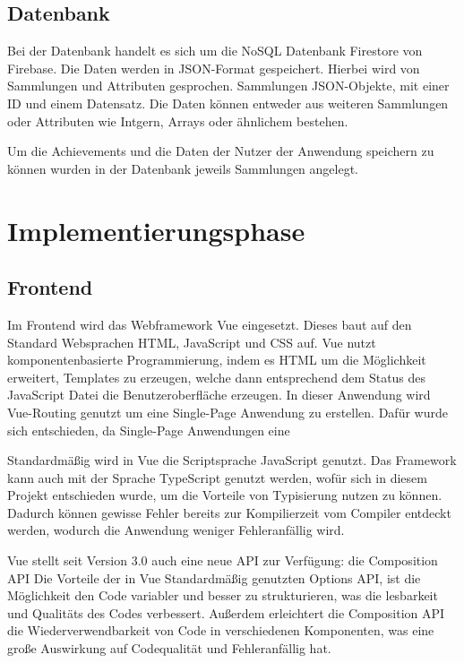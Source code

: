 \documentclass[12pt]{article}
\begin{document}
\subsection{Datenbank}

Bei der Datenbank handelt es sich um die NoSQL Datenbank Firestore
von Firebase. Die Daten werden in JSON-Format gespeichert. Hierbei wird
von Sammlungen und Attributen gesprochen. Sammlungen JSON-Objekte, mit einer
ID und einem Datensatz. Die Daten können entweder aus weiteren Sammlungen
oder Attributen wie Intgern, Arrays oder ähnlichem bestehen.

Um die Achievements und die Daten der Nutzer der Anwendung speichern zu können
wurden in der Datenbank jeweils Sammlungen angelegt.


%
%

\section{Implementierungsphase}

\subsection{Frontend}

Im Frontend wird das Webframework Vue eingesetzt. Dieses baut auf den
Standard Websprachen HTML, JavaScript und CSS auf. Vue nutzt
komponentenbasierte Programmierung, indem es HTML um die Möglichkeit
erweitert, Templates zu erzeugen, welche dann entsprechend dem Status des
JavaScript Datei die Benutzeroberfläche erzeugen.
In dieser Anwendung wird Vue-Routing genutzt um eine Single-Page Anwendung zu
erstellen. Dafür wurde sich entschieden, da Single-Page Anwendungen eine 

Standardmäßig wird in Vue die Scriptsprache JavaScript genutzt. Das Framework
kann auch mit der Sprache TypeScript genutzt werden, wofür sich in diesem
Projekt entschieden wurde, um die Vorteile von Typisierung nutzen zu können.
Dadurch können gewisse Fehler bereits zur Kompilierzeit vom Compiler entdeckt werden,
wodurch die Anwendung weniger Fehleranfällig wird.


Vue stellt seit Version 3.0 auch eine neue API zur Verfügung: die Composition API
Die Vorteile der in Vue Standardmäßig genutzten Options API, ist die Möglichkeit
den Code variabler und besser zu strukturieren, was die lesbarkeit und Qualitäts des
Codes verbessert. Außerdem erleichtert die Composition API die Wiederverwendbarkeit
von Code in verschiedenen Komponenten, was eine große Auswirkung auf Codequalität und
Fehleranfällig hat.
\end{document}
